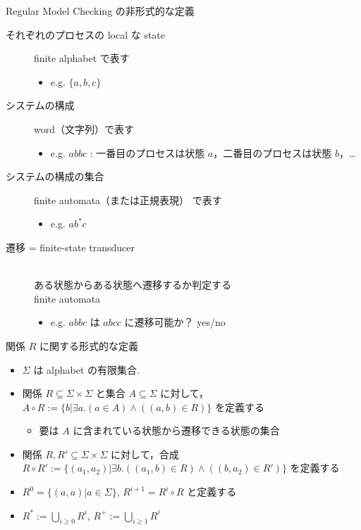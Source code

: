 \documentclass[presentation, xetex]{beamer}
\begin{document}
\begin{frame}[label={sec:org05bd4a2}]{Regular Model Checking の非形式的な定義}
\begin{description}
\item[{それぞれのプロセスの local な state}] finite alphabet で表す
\begin{itemize}
\item e.g. \(\{a, b, c\}\)
\end{itemize}
\item[{システムの構成}] word（文字列）で表す
\begin{itemize}
\item e.g. \(abbc\) : 一番目のプロセスは状態 \(a\)，二番目のプロセスは状態 \(b\)，\ldots{}
\end{itemize}
\item[{システムの構成の集合}] finite automata（または正規表現） で表す
\begin{itemize}
\item e.g. \(ab^*c\)
\end{itemize}
\item[{遷移 = \alert{\alert{finite-state transducer}}}] \mbox{}\\
ある状態からある状態へ遷移するか判定する\\
finite automata
\begin{itemize}
\item e.g. \(abbc\) は \(abcc\) に遷移可能か？ \thusmark yes/no
\end{itemize}
\end{description}
\end{frame}


\begin{frame}[label={sec:org1dca0d3}]{関係 \(R\) に関する形式的な定義}
\begin{itemize}
\item \(\Sigma\) は \alert{\alert{alphabet}} の有限集合.
\item 関係 \(R \subseteq \Sigma \times \Sigma\) と集合 \(A \subseteq \Sigma\) に対して，\\
\(A \circ R := \{b | \exists a. (a \in A) \land ((a, b) \in R)\}\) を定義する
\begin{itemize}
\item 要は \(A\) に含まれている状態から遷移できる状態の集合
\end{itemize}
\item 関係 \(R, R' \subseteq \Sigma \times \Sigma\) に対して，合成
\(R \circ R' := \{(a_1, a_2) | \exists b. ((a_1, b) \in R) \land ((b, a_2) \in R')\}\)
を定義する
\item \(R^0 = \{(a, a) | a \in \Sigma\}\), \(R^{i + 1} = R^i \circ R\) と定義する
\item \(R^* := \bigcup_{i \geq 0} R^i\), \(R^+ := \bigcup_{i \geq 1} R^i\)
\end{itemize}
\end{frame}
\end{document}
